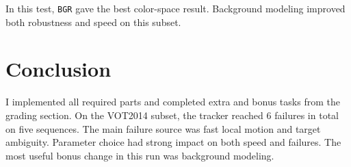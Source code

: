 \documentclass[9pt]{IEEEtran}
\begin{document}
In this test, \texttt{BGR} gave the best color-space result.
Background modeling improved both robustness and speed on this subset.

\section{Conclusion}
I implemented all required parts and completed extra and bonus tasks from the grading section.
On the VOT2014 subset, the tracker reached 6 failures in total on five sequences.
The main failure source was fast local motion and target ambiguity.
Parameter choice had strong impact on both speed and failures.
The most useful bonus change in this run was background modeling.
\end{document}

